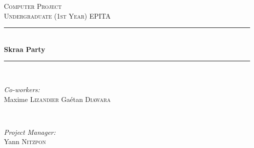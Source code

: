 \documentclass[12pt]{article}
\newcommand{\HRule}{\rule{\linewidth}{0.5mm}} %
\begin{document}
\begin{titlepage}

\center %
 

\textsc{\LARGE Computer Project}\\[1.5cm] %
\textsc{\Large Undergraduate (1st Year) EPITA}\\[0.5cm] %



\HRule \\[0.4cm]
{ \huge \bfseries Skraa Party}\\[0.4cm] %
\HRule \\[1.5cm]
 

\begin{minipage}{0.4\textwidth}
\begin{flushleft} \large
\emph{Co-workers:}\\
Maxime \textsc{Lizandier} %
Ga\'etan \textsc{Diawara}
\end{flushleft}
\end{minipage}
~
\begin{minipage}{0.4\textwidth}
\begin{flushright} \large
\emph{Project Manager:} \\
Yann \textsc{Nitzpon} %
\end{flushright}
\end{minipage}\\[2cm]
 \end{titlepage}

\end{document}
